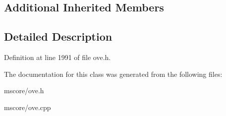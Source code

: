 \subsection*{Additional Inherited Members}


\subsection{Detailed Description}


Definition at line 1991 of file ove.\+h.



The documentation for this class was generated from the following files\+:\begin{DoxyCompactItemize}
\item 
mscore/ove.\+h\item 
mscore/ove.\+cpp\end{DoxyCompactItemize}
